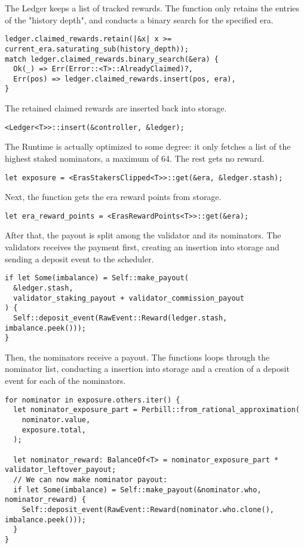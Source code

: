 \documentclass[11pt,a4paper]{article}
\begin{document}
The Ledger keeps a list of tracked rewards. The function only retains the entries of the "history depth",
and conducts a binary search for the specified era.

\begin{verbatim}
ledger.claimed_rewards.retain(|&x| x >= current_era.saturating_sub(history_depth));
match ledger.claimed_rewards.binary_search(&era) {
  Ok(_) => Err(Error::<T>::AlreadyClaimed)?,
  Err(pos) => ledger.claimed_rewards.insert(pos, era),
}
\end{verbatim}

The retained claimed rewards are inserted back into storage.

\begin{verbatim}
<Ledger<T>>::insert(&controller, &ledger);
\end{verbatim}

The Runtime is actually optimized to some degree: it only fetches a list of the highest staked nominators,
a maximum of 64. The rest gets no reward.

\begin{verbatim}
let exposure = <ErasStakersClipped<T>>::get(&era, &ledger.stash);
\end{verbatim}

Next, the function gets the era reward points from storage.

\begin{verbatim}
let era_reward_points = <ErasRewardPoints<T>>::get(&era);
\end{verbatim}

After that, the payout is split among the validator and its nominators. The validators receives the payment
first, creating an insertion into storage and sending a deposit event to the scheduler.

\begin{verbatim}
if let Some(imbalance) = Self::make_payout(
  &ledger.stash,
  validator_staking_payout + validator_commission_payout
) {
  Self::deposit_event(RawEvent::Reward(ledger.stash, imbalance.peek()));
}
\end{verbatim}

Then, the nominators receive a payout. The functions loops through the nominator list, conducting
a insertion into storage and a creation of a deposit event for each of the nominators.

\begin{verbatim}
for nominator in exposure.others.iter() {
  let nominator_exposure_part = Perbill::from_rational_approximation(
    nominator.value,
    exposure.total,
  );

  let nominator_reward: BalanceOf<T> = nominator_exposure_part * validator_leftover_payout;
  // We can now make nominator payout:
  if let Some(imbalance) = Self::make_payout(&nominator.who, nominator_reward) {
    Self::deposit_event(RawEvent::Reward(nominator.who.clone(), imbalance.peek()));
  }
}
\end{verbatim}
\end{document}

